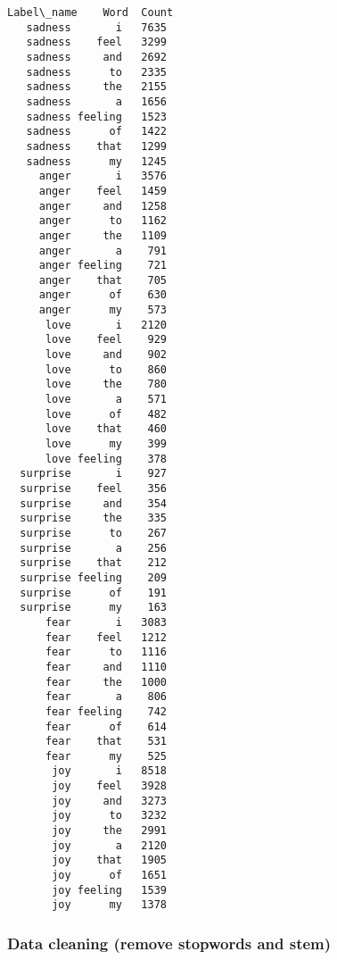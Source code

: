 \documentclass[8pt]{extarticle}
\begin{document}
    \begin{Verbatim}[commandchars=\\\{\}]
Label\_name    Word  Count
   sadness       i   7635
   sadness    feel   3299
   sadness     and   2692
   sadness      to   2335
   sadness     the   2155
   sadness       a   1656
   sadness feeling   1523
   sadness      of   1422
   sadness    that   1299
   sadness      my   1245
     anger       i   3576
     anger    feel   1459
     anger     and   1258
     anger      to   1162
     anger     the   1109
     anger       a    791
     anger feeling    721
     anger    that    705
     anger      of    630
     anger      my    573
      love       i   2120
      love    feel    929
      love     and    902
      love      to    860
      love     the    780
      love       a    571
      love      of    482
      love    that    460
      love      my    399
      love feeling    378
  surprise       i    927
  surprise    feel    356
  surprise     and    354
  surprise     the    335
  surprise      to    267
  surprise       a    256
  surprise    that    212
  surprise feeling    209
  surprise      of    191
  surprise      my    163
      fear       i   3083
      fear    feel   1212
      fear      to   1116
      fear     and   1110
      fear     the   1000
      fear       a    806
      fear feeling    742
      fear      of    614
      fear    that    531
      fear      my    525
       joy       i   8518
       joy    feel   3928
       joy     and   3273
       joy      to   3232
       joy     the   2991
       joy       a   2120
       joy    that   1905
       joy      of   1651
       joy feeling   1539
       joy      my   1378
    \end{Verbatim}

    \subsubsection{Data cleaning (remove stopwords and
stem)}\label{data-cleaning-remove-stopwords-and-stem}
\end{document}
